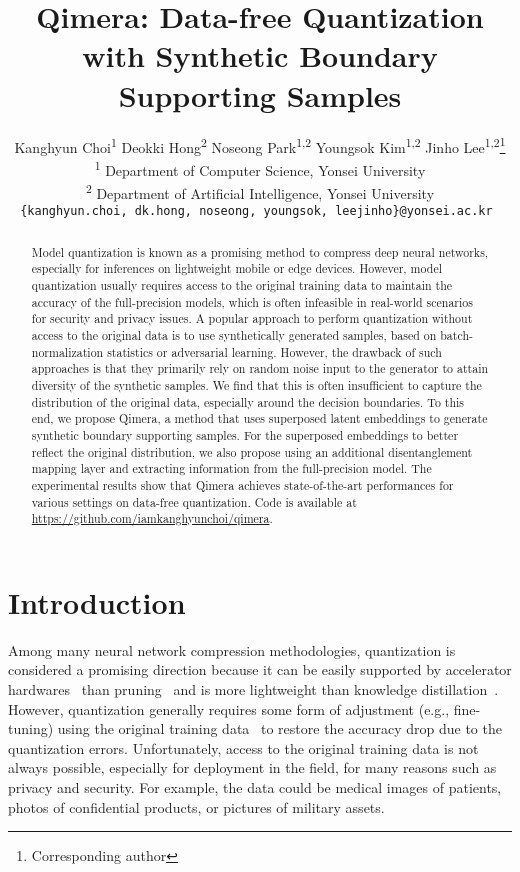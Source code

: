 \documentclass{article}
\title{Qimera: Data-free Quantization with Synthetic Boundary Supporting Samples}
\author{Kanghyun Choi\textsuperscript{1} \And Deokki Hong\textsuperscript{2} \And Noseong Park\textsuperscript{1,2} \And Youngsok Kim\textsuperscript{1,2} \And Jinho Lee\textsuperscript{1,2}\thanks{Corresponding author} \AND \\
  \textsuperscript{1} Department of Computer Science, Yonsei University\\
  \textsuperscript{2} Department of Artificial Intelligence, Yonsei University\\ 
  \texttt{\{kanghyun.choi, dk.hong, noseong, youngsok, leejinho\}@yonsei.ac.kr }


  
}
\begin{document}
\maketitle


\begin{abstract}
Model quantization is known as a promising method to compress deep neural networks, especially for inferences on lightweight mobile or edge devices. 
However, model quantization usually requires access to the original training data to maintain the accuracy of the full-precision models, which is often infeasible in real-world scenarios for security and privacy issues.
A popular approach to perform quantization without access to the original data is to use synthetically generated samples, based on batch-normalization statistics or adversarial learning.
However, the drawback of such approaches is that they primarily rely on random noise input to the generator to attain diversity of the synthetic samples. 
We find that this is often insufficient to capture the distribution of the original data, especially around the decision boundaries.
To this end, we propose Qimera, a method that uses superposed latent embeddings to generate synthetic boundary supporting samples.
For the superposed embeddings to better reflect the original distribution, we also propose using an additional disentanglement mapping layer and extracting information from the full-precision model.
The experimental results show that Qimera achieves state-of-the-art performances for various settings on data-free quantization. 
Code is available at \url{https://github.com/iamkanghyunchoi/qimera}.

\end{abstract}

\section{Introduction}
Among many neural network compression methodologies, quantization is considered a promising direction because it can be easily supported by accelerator hardwares~\cite{tpu} than pruning~\cite{deepcompression} and is more lightweight than knowledge distillation~\cite{hinton2015distilling}.
However, quantization generally requires some form of adjustment (e.g., fine-tuning) using the original training data~\cite{dorefa, zhuang2018towards, robustnessdefensive, jacob2018quantization, shen2020q} to restore the accuracy drop due to the quantization errors.
Unfortunately, access to the original training data is not always possible, especially for deployment in the field, for many reasons such as privacy and security.
For example, the data could be medical images of patients, photos of confidential products, or pictures of military assets.
\end{document}
